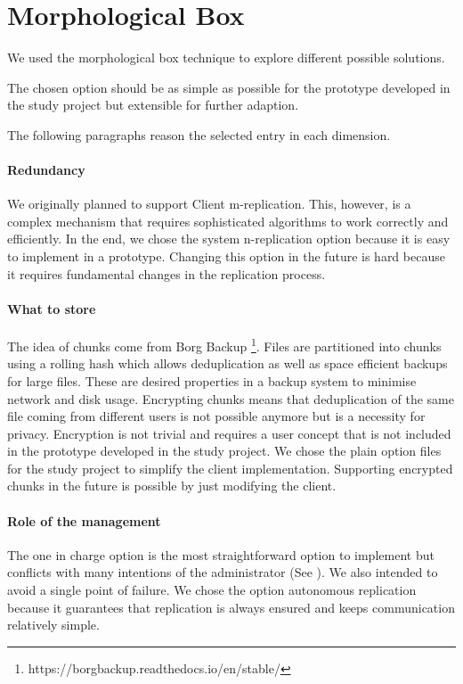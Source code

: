 \section{Morphological Box}
We used the morphological box technique to explore different possible solutions.

The chosen option should be as simple as possible for the prototype developed in the study project but extensible for further adaption.

The following paragraphs reason the selected entry in each dimension.

\paragraph{Redundancy} 
We originally planned to support Client m-replication. This, however, is a complex mechanism that requires sophisticated algorithms to work correctly and efficiently. In the end, we chose the system n-replication option because it is easy to implement in a prototype. Changing this option in the future is hard because it requires fundamental changes in the replication process.

\paragraph{What to store}
The idea of chunks come from Borg Backup \footnote{https://borgbackup.readthedocs.io/en/stable/}. Files are partitioned into chunks using a rolling hash which allows deduplication as well as space efficient backups for large files. These are desired properties in a backup system to minimise network and disk usage.
Encrypting chunks means that deduplication of the same file coming from different users is not possible anymore but is a necessity for privacy. Encryption is not trivial and requires a user concept that is not included in the prototype developed in the study project.
We chose the plain option files for the study project to simplify the client implementation. Supporting encrypted chunks in the future is possible by just modifying the client.

\paragraph{Role of the management}
The one in charge option is the most straightforward option to implement but conflicts with many intentions of the administrator (See ). We also intended to avoid a single point of failure. We chose the option autonomous replication because it guarantees that replication is always ensured and keeps communication relatively simple.


